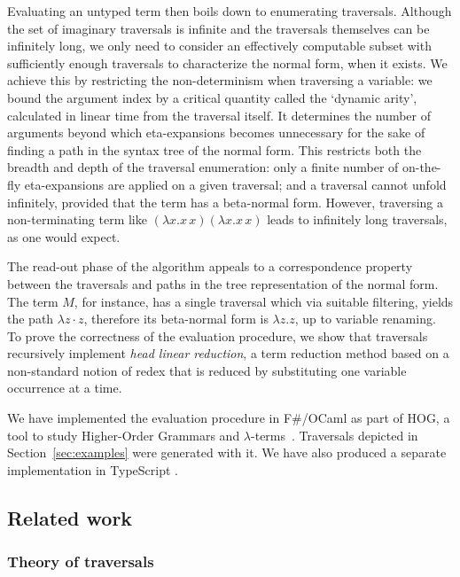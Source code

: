 \documentclass[xchauthor,chkrefs,GCNS,amsmath,amsthm,rotating,leaveRGB]{tcsg}
\theoremstyle{plain}
\theoremstyle{definition}
\begin{document}
Evaluating an untyped term then boils down to enumerating traversals.
Although the set of imaginary traversals is infinite and the traversals
themselves can be infinitely long, we only need to consider an effectively
computable subset with sufficiently enough traversals to characterize the
normal form, when it exists. We achieve this by restricting the
non-determinism when traversing a variable: we bound the argument index by a
critical quantity called the `dynamic arity', calculated in linear time from
the traversal itself. It determines the number of arguments beyond which
eta-expansions becomes unnecessary for the sake of finding a path in the
syntax tree of the normal form. This restricts both the breadth and depth of
the traversal enumeration: only a finite number of on-the-fly eta-expansions
are applied on a given traversal; and a traversal cannot unfold infinitely,
provided that the term has a beta-normal form. However, traversing
a non-terminating term like $(\lambda x. x\,x)(\lambda x. x\,x)$ leads to
infinitely long traversals, as one would expect.

The read-out phase of the algorithm appeals to a correspondence property
between the traversals and paths in the tree representation of the normal
form. The term $M$, for instance, has a single traversal which via suitable
filtering, yields the path $\lambda z \cdot z$, therefore its beta-normal
form is $\lambda z. z$, up to variable renaming. To prove the correctness of the
evaluation procedure, we show that traversals recursively implement
\emph{head linear reduction}, a term reduction method based on a non-standard
notion of redex that is reduced by substituting one variable occurrence at a
time.

We have implemented the evaluation procedure in F\#/OCaml as part of HOG, a
tool to study Higher-Order Grammars and $\lambda
$-terms~\cite{BlumGalop2008,Blum-HogTool}. Traversals depicted in
Section~\ref{sec:examples} were generated with it. We have also produced a
separate implementation in TypeScript \cite{BlumTypeScriptTraversal2019}.

\subsection{Related work}\label{sec1.3}

\subsubsection{Theory of traversals}\label{sec1.3.1}
\end{document}
